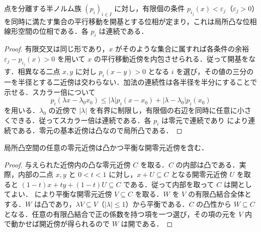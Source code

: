 \begin{prop}[半ノルム族が定める位相]
点を分離する半ノルム族 $(p_i)_{i\in I}$ に対し，有限個の条件 $p_{i_j}(x)<\varepsilon_j$（$\varepsilon_j>0$）を同時に満たす集合の平行移動を開基とする位相が定まり，これは局所凸な位相線形空間の位相である．各 $p_i$ は連続である．
\end{prop}
\begin{proof}
有限交叉は同じ形であり，$x$ がそのような集合に属すれば各条件の余裕 $\varepsilon_j-p_{i_j}(x)>0$ を用いて $x$ の平行移動近傍を内包させられる．従って開基をなす．相異なる二点 $x,y$ に対し $p_i(x-y)>0$ となる $i$ を選び，その値の三分の一を半径とする二近傍は交わらない．加法の連続性は各半径を半分にすることで示せる．スカラー倍について
\[
p_i(\lambda x-\lambda_0x_0)\leq|\lambda|p_i(x-x_0)+|\lambda-\lambda_0|p_i(x_0)
\]
を用いる．$\lambda_0$ の近傍で $|\lambda|$ を有界に制限し，有限個の右辺を同時に任意に小さくできる．従ってスカラー倍は連続である．各 $p_i$ は零元で連続であり  により連続である．零元の基本近傍は凸なので局所凸である．
\end{proof}
\begin{prop}[凸平衡開近傍の存在]
局所凸空間の任意の零元近傍は凸かつ平衡な開零元近傍を含む．
\end{prop}
\begin{proof}
与えられた近傍内の凸な零元近傍 $C$ を取る．$C$ の内部は凸である．実際，内部の二点 $x,y$ と $0<t<1$ に対し，$x+U\subseteq C$ となる開零元近傍 $U$ を取ると $(1-t)x+ty+(1-t)U\subseteq C$ である．従って内部を取って $C$ は開としてよい． により平衡な開零元近傍 $V\subseteq C$ を取る．$W$ を $V$ の有限凸結合全体とする．$W$ は凸であり，$\lambda V\subseteq V$（$|\lambda|\leq1$）から平衡である．$C$ の凸性から $W\subseteq C$ となる．任意の有限凸結合で正の係数を持つ項を一つ選び，その項の元を $V$ 内で動かせば開近傍が得られるので $W$ は開である．
\end{proof}
